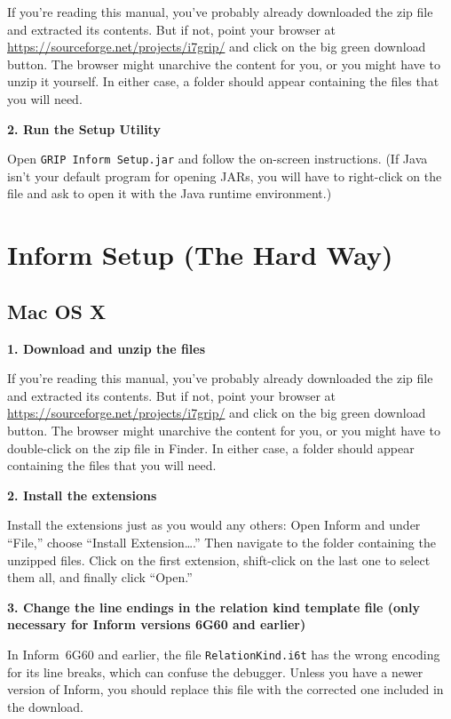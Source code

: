 \documentclass{book}
\newcommand{\lastpagebreak}{\vfill\pagebreak}
\begin{document}
If you're reading this manual, you've probably already downloaded the zip file
and extracted its contents.  But if not, point your browser at
\url{https://sourceforge.net/projects/i7grip/} and click on the big green
download button.  The browser might unarchive the content for you, or you might
have to unzip it yourself.  In either case, a folder should appear containing
the files that you will need.

\textbf{2. Run the Setup Utility}

Open \texttt{GRIP Inform Setup.jar} and follow the on-screen instructions.  (If
Java isn't your default program for opening JARs, you will have to right-click
on the file and ask to open it with the Java runtime environment.)

\lastpagebreak

\section{Inform Setup (The Hard Way)}
\label{installing-hard}

\subsection{Mac OS X}

\textbf{1. Download and unzip the files}

If you're reading this manual, you've probably already downloaded the zip file
and extracted its contents.  But if not, point your browser at
\url{https://sourceforge.net/projects/i7grip/} and click on the big green
download button.  The browser might unarchive the content for you, or you might
have to double-click on the zip file in Finder.  In either case, a folder should
appear containing the files that you will need.

\textbf{2. Install the extensions}

Install the extensions just as you would any others: Open Inform and under
``File,'' choose ``Install Extension\dots.''  Then navigate to the folder
containing the unzipped files.  Click on the first extension, shift-click on the
last one to select them all, and finally click ``Open.''

\textbf{3. Change the line endings in the relation kind template file (only
  necessary for Inform versions 6G60 and earlier)}

In Inform~6G60 and earlier, the file \texttt{RelationKind.i6t} has the wrong
encoding for its line breaks, which can confuse the debugger.  Unless you have a
newer version of Inform, you should replace this file with the corrected one
included in the download.
\end{document}
